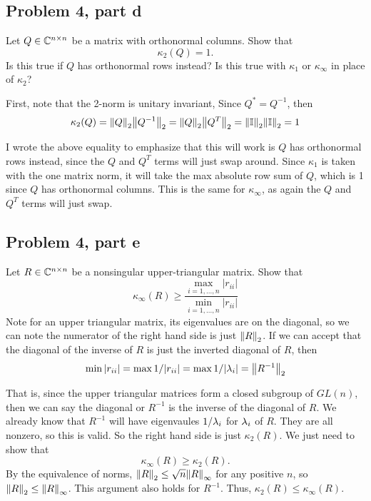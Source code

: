 \newpage
 \subsection{Problem 4, part d}
 Let $Q \in \mathbb{C}^{n\times n}$ be a matrix with orthonormal columns. Show that 
 \[
 \kappa_2(Q) = 1.
 \]
 Is this true if $Q$ has orthonormal rows instead? Is this true with $\kappa_1$ or $\kappa_\infty$ in place of $\kappa_2$?
 \partbreak
 \begin{solution}
     First, note that the 2-norm is unitary invariant, Since $Q^* = Q^{-1}$, then 
     \[
     \kappa_2(Q) = \norm{Q}_2 \norm{Q^{-1}}_2 = \norm{Q}_2\norm{Q^T}_2 = \norm{\mathbb{I}}_2\norm{\mathbb{I}}_2 = 1
     \]

     I wrote the above equality to emphasize that this will work is $Q$ has orthonormal rows instead, since the $Q$ and $Q^T$ terms will just swap around. Since $\kappa_1$ is taken with the one matrix norm, it will take the max absolute row sum of $Q$, which is 1 since $Q$ has orthonormal columns. This is the same for $\kappa_\infty$, as again the $Q$ and $Q^T$ terms will just swap.  
 \end{solution}

 \subsection{Problem 4, part e}
 Let $R \in \mathbb{C}^{n\times n}$ be a nonsingular upper-triangular matrix. Show that
 \[
 \kappa_\infty(R) \geq \frac{\max_{i = 1, ..., n}|r_{ii}|}{\min_{i = 1, ..., n}|r_{ii}|}
 \]
 \partbreak
 Note for an upper triangular matrix, its eigenvalues are on the diagonal, so we can note the numerator of the right hand side is just $\norm{R}_2$. If we can accept that the diagonal of the inverse of $R$ is just the inverted diagonal of $R$, then 
 \[
 \min |r_{ii}| = \max 1/|r_{ii}| = \max 1/|\lambda_i| = \norm{R^{-1}}_2
 \]

 That is, since the upper triangular matrices form a closed subgroup of $GL(n)$, then we can say the diagonal or $R^{-1}$ is the inverse of the diagonal of $R$. We already know that $R^{-1}$ will have eigenvaules $1/\lambda_i$ for $\lambda_i$ of $R$. They are all nonzero, so this is valid. So the right hand side is just $\kappa_2(R)$. We just need to show that 
 \[
 \kappa_\infty(R) \geq \kappa_2(R).
 \]
 By the equivalence of norms, $\norm{R}_2 \leq \sqrt{n}\norm{R}_\infty$ for any positive $n$, so $\norm{R}_2 \leq \norm{R}_\infty$. This argument also holds for $R^{-1}$. Thus, $\kappa_2(R) \leq \kappa_\infty(R)$. 

